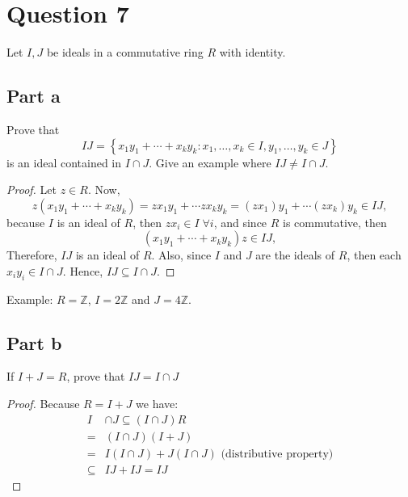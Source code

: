 \section{Question 7}

\begin{question}
    Let $I, J$ be ideals in a commutative ring $R$ with identity.
\end{question}

\subsection{Part a}

\begin{question}
    Prove that
    $$
    I J=\left\{x_1 y_1+\cdots+x_k y_k: x_1, \ldots, x_k \in I, y_1, \ldots, y_k \in J\right\}
    $$
    is an ideal contained in $I \cap J$. Give an example where $I J \neq I \cap J$.
\end{question}

\begin{answer}
    \begin{proof}
        Let $z \in R$. Now,
        \begin{equation}
            z(x_1 y_1+\cdots+x_k y_k) = zx_1y_1 + \cdots zx_ky_k = (zx_1)y_1 + \cdots (zx_k)y_k \in IJ,
        \end{equation}
        because $I$ is an ideal of $R$, then $zx_i \in I\; \forall i$, and since $R$ is commutative, then
        \begin{equation}
            (x_1 y_1+\cdots+x_k y_k)z \in IJ,
        \end{equation}
        Therefore, $IJ$ is an ideal of $R$. Also, since $I$ and $J$ are the ideals of $R$, then each $x_iy_i \in I\cap J$. Hence, $IJ \subseteq I \cap J$.
    \end{proof}
    Example: $R = \mathbb{Z}$, $I = 2\mathbb{Z}$ and $J = 4\mathbb{Z}$.
\end{answer}

\subsection{Part b}

\begin{question}
    If $I+J=R$, prove that $I J=I \cap J$
\end{question}

\begin{answer}
    \begin{proof}
        Because $R = I+J$ we have:
        $$
        \begin{aligned}
            I &\cap J \subseteq(I \cap J) R\\
            = &(I \cap J)(I+J)\\
            =&I(I \cap J)+J(I \cap J) \text{ (distributive property)}\\
            \subseteq &I J+I J=I J
        \end{aligned}
        $$
    \end{proof}
\end{answer}
